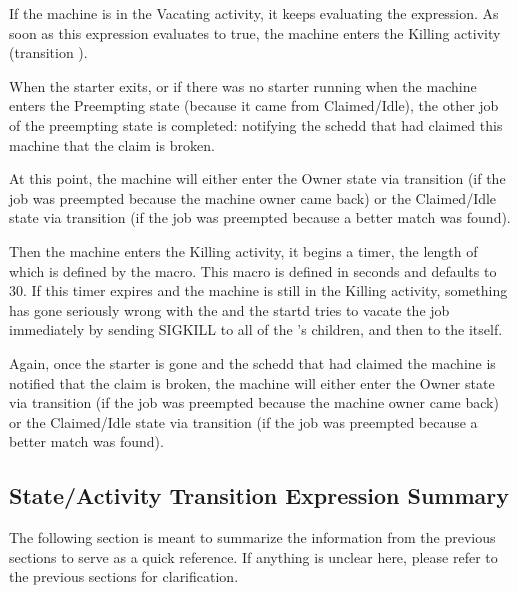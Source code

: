 If the machine is in the Vacating activity, it keeps evaluating the 
 expression.  As soon as this expression evaluates to true,
the machine enters the Killing activity (transition ).

When the starter exits, or if there was no starter running when the
machine enters the Preempting state (because it came from
Claimed/Idle), the other job of the preempting state is completed:
notifying the schedd that had claimed this machine that the claim is
broken.

At this point, the machine will either enter the Owner state via
transition  (if the job was preempted because the machine
owner came back) or the Claimed/Idle state via transition 
(if the job was preempted because a better match was found).

Then the machine enters the Killing activity, it begins a timer, the
length of which is defined by the 
\label{param:KillingTimeout} macro.  This macro is defined in seconds 
and defaults to 30.  If this timer expires and the machine is still in
the Killing activity, something has gone seriously wrong with the
 and the startd tries to vacate the job immediately by
sending SIGKILL to all of the 's children, and then to
the  itself.

Again, once the starter is gone and the schedd that had claimed the
machine is notified that the claim is broken, the machine will either
enter the Owner state via transition  (if the job was
preempted because the machine owner came back) or the Claimed/Idle
state via transition  (if the job was preempted because a
better match was found). 

\subsection{State/Activity Transition Expression Summary}
\label{sec:State-Expression-Summary}
The following section is meant to summarize the information from the
previous sections to serve as a quick reference.  If anything is
unclear here, please refer to the previous sections for clarification.

